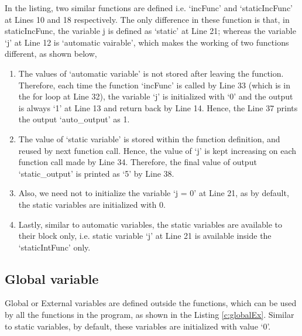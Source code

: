 \begin{explanation}
	In the listing, two similar functions are defined i.e. `incFunc' and `staticIncFunc' at Lines 10 and 18 respectively. The only difference in these function is that, in staticIncFunc, the variable j is defined as `static' at Line 21; whereas the variable `j' at Line 12 is `automatic vairable', which makes the working of two functions different, as shown below, 
	\begin{enumerate}
		\item The values of `automatic variable' is not stored after leaving the function. Therefore, each time the function `incFunc' is called by Line 33 (which is in the for loop at Line 32), the variable `j' is initialized with `0' and the output is always `1' at Line 13 and return back by Line 14. Hence, the Line 37 prints the output `auto\_output' as 1. 
		
		\item The value of `static variable' is stored within the function definition, and reused by next function call. Hence, the value of `j' is kept increasing on each function call made by Line 34. Therefore, the final value of output `static\_output' is printed as `5' by Line 38. 
		
		\item Also, we need not to initialize the variable `j = 0' at Line 21, as by default, the static variables are initialized with 0.
		
		\item Lastly, similar to automatic variables, the static variables are available to their block only, i.e. static variable `j' at Line 21 is available inside the `staticIntFunc' only.
	\end{enumerate}
\end{explanation}



\subsection{Global variable}
Global or External variables are defined outside the functions, which can be used by all the functions in the program, as shown in the Listing \ref{c:globalEx}. Similar to static variables, by default, these variables are initialized with value `0'.  

